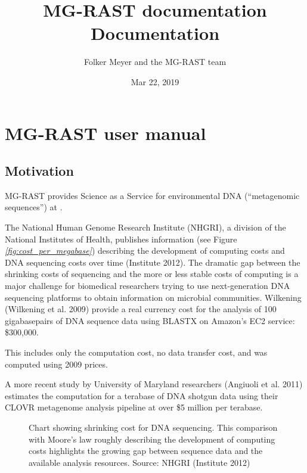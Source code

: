 \documentclass[letterpaper,10pt,english]{sphinxmanual}
\title{MG-RAST documentation Documentation}
\date{Mar 22, 2019}
\author{Folker Meyer and the MG-RAST team}
\begin{document}
\pagestyle{empty}
\sphinxmaketitle
\pagestyle{plain}
\sphinxtableofcontents
\pagestyle{normal}
\label{\detokenize{index::doc}}



\chapter{MG-RAST user manual}
\label{\detokenize{user_manual:mg-rast-user-manual}}\label{\detokenize{user_manual::doc}}

\section{Motivation}
\label{\detokenize{user_manual:motivation}}
MG-RAST provides Science as a Service for environmental DNA
(“metagenomic sequences”) at .

The National Human Genome Research Institute (NHGRI), a division of the
National Institutes of Health, publishes information (see Figure
{\hyperref[\detokenize{user_manual:fig:cost_per_megabase}]{\emph{{[}fig:cost\_per\_megabase{]}}}}) describing the
development of computing costs and DNA sequencing costs over time
(Institute 2012). The dramatic gap between the shrinking costs of
sequencing and the more or less stable costs of computing is a major
challenge for biomedical researchers trying to use next-generation DNA
sequencing platforms to obtain information on microbial communities.
Wilkening  (Wilkening et al. 2009) provide a real currency cost
for the analysis of 100 gigabasepairs of DNA sequence data using BLASTX
on Amazon’s EC2 service: \$300,000. %
\begin{footnote}[1]\sphinxAtStartFootnote
This includes only the computation cost, no data transfer cost, and
was computed using 2009 prices.
%
\end{footnote} A more recent study by
University of Maryland researchers (Angiuoli et al. 2011) estimates the
computation for a terabase of DNA shotgun data using their CLOVR
metagenome analysis pipeline at over \$5 million per terabase.

\begin{figure}[htbp]
\centering
\capstart

\noindent{}
\caption{Chart showing shrinking cost for DNA sequencing. This comparison with
Moore’s law roughly describing the development of computing costs
highlights the growing gap between sequence data and the available
analysis resources. Source: NHGRI (Institute 2012)}\label{\detokenize{user_manual:id12}}\end{figure}
\end{document}
